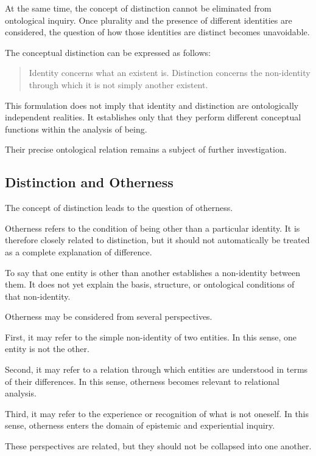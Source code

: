 At the same time, the concept of distinction cannot be eliminated
from ontological inquiry. Once plurality and the presence of
different identities are considered, the question of how those
identities are distinct becomes unavoidable.

The conceptual distinction can be expressed as follows:

\begin{quote}
Identity concerns what an existent is. Distinction concerns
the non-identity through which it is not simply another existent.
\end{quote}

This formulation does not imply that identity and distinction
are ontologically independent realities. It establishes only
that they perform different conceptual functions within the
analysis of being.

Their precise ontological relation remains a subject of further
investigation.

\subsection{Distinction and Otherness}

The concept of distinction leads to the question of otherness.

Otherness refers to the condition of being other than a particular
identity. It is therefore closely related to distinction, but it
should not automatically be treated as a complete explanation
of difference.

To say that one entity is other than another establishes a
non-identity between them. It does not yet explain the basis,
structure, or ontological conditions of that non-identity.

Otherness may be considered from several perspectives.

First, it may refer to the simple non-identity of two entities.
In this sense, one entity is not the other.

Second, it may refer to a relation through which entities are
understood in terms of their differences. In this sense,
otherness becomes relevant to relational analysis.

Third, it may refer to the experience or recognition of what
is not oneself. In this sense, otherness enters the domain
of epistemic and experiential inquiry.

These perspectives are related, but they should not be
collapsed into one another.

